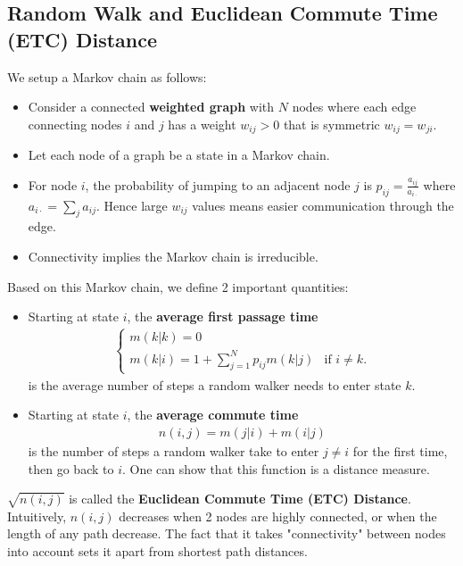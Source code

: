 \documentclass[./some_latex_template.tex]{subfiles}
\begin{document}
\subsection{Random Walk and Euclidean Commute Time (ETC) Distance}

We setup a Markov chain as follows:
\begin{itemize}
	\item Consider a connected \textbf{weighted graph} with $N$ nodes where each edge connecting nodes $i$ and $j$ has a weight $w_{ij} > 0$ that is symmetric $w_{ij} = w_{ji}$. 
	\item Let each node of a graph be a state in a Markov chain. 
	\item For node $i$, the probability of jumping to an adjacent node $j$ is $p_{ij} = \frac{a_{ij}}{a_{i\cdot}}$ where $a_{i\cdot} = \sum_{j} a_{ij}.$ Hence large $w_{ij}$ values means easier communication through the edge. 
	\item Connectivity implies the Markov chain is irreducible. 
\end{itemize}

\noindent Based on this Markov chain, we define 2 important quantities: 

\begin{itemize}
	\item Starting at state $i$, the \textbf{average first passage time} \begin{align}\label{eq:m}		
		\begin{cases}
			m(k|k) = 0 \\
			m(k|i) = 1 + \sum_{j=1}^N p_{ij}m(k|j) & \text{if } i\neq k.
		\end{cases}
	\end{align}
	is the average number of steps a random walker needs to enter state $k$.
	\item Starting at state $i$, the \textbf{average commute time} 
	\begin{align*}
		n(i,j) = m(j|i) + m(i|j)
	\end{align*}
	is the number of steps a random walker take to enter $j \neq i$ for the first time, then go back to $i$. One can show that this function is a distance measure. 
\end{itemize}

\noindent $\sqrt{n(i, j)}$ is called the \textbf{Euclidean Commute Time (ETC) Distance}. Intuitively, $n(i, j)$ decreases when 2 nodes are highly connected, or when the length of any path decrease. The fact that it takes "connectivity" between nodes into account sets it apart from  shortest path distances.
\end{document}
